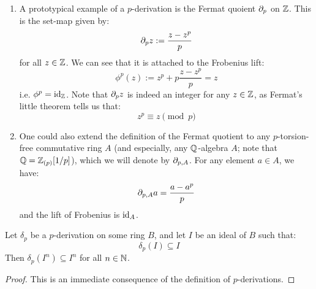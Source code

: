                     \begin{example} \label{example: p_derivations}
                        \noindent
                        \begin{enumerate}
                            \item A prototypical example of a $p$-derivation is the Fermat quoient $\partial_p$ on $\mathbb{Z}$. This is the set-map given by:
                                $$\partial_p z := \frac{z - z^p}{p}$$
                            for all $z \in \mathbb{Z}$. We can see that it is attached to the Frobenius lift:
                                $$\phi^p(z) := z^p + p \frac{z - z^p}{p} = z$$
                            i.e. $\phi^p = \mathrm{id}_{\mathbb{Z}}$. Note that $\partial_p z$ is indeed an integer for any $z \in \mathbb{Z}$, as Fermat's little theorem tells us that:
                                $$z^p \equiv z \pmod{p}$$
                            \item One could also extend the definition of the Fermat quotient to any $p$-torsion-free commutative ring $A$ (and especially, any $\mathbb{Q}$-algebra $A$; note that $\mathbb{Q} = \mathbb{Z}_{(p)}[1/p]$), which we will denote by $\partial_{p,A}$. For any element $a \in A$, we have:
                                $$\partial_{p,A}a = \frac{a - a^p}{p}$$
                            and the lift of Frobenius is $\mathrm{id}_A$.
                        \end{enumerate}
                    \end{example}
                        
                    \begin{proposition}
                        Let $\delta_p$ be a $p$-derivation on some ring $B$, and let $I$ be an ideal of $B$ such that:
                            $$\delta_p(I) \subseteq I$$
                        Then $\delta_p(I^n) \subseteq I^n$ for all $n \in \mathbb{N}$. 
                    \end{proposition}
                        \begin{proof}
                            This is an immediate consequence of the definition of $p$-derivations.
                        \end{proof}
                        
